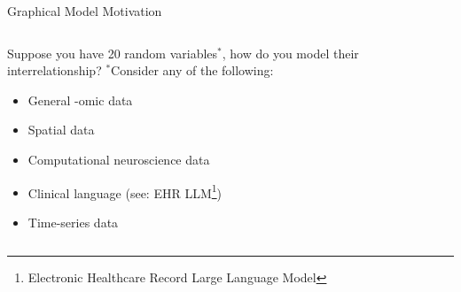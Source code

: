 \documentclass{beamer}
\begin{document}
\begin{frame}{Graphical Model Motivation}
    \begin{columns}[T]
        \begin{column}{0.6\textwidth}
            Suppose you have 20 random variables$^*$, how do you model their interrelationship? \newline 
            \vspace{2mm}
            $^*$Consider any of the following:
            \begin{itemize}
                \setlength
            \item General -omic data
            \item Spatial data 
            \item Computational neuroscience data 
            \item Clinical language (see: EHR LLM\footnote{Electronic Healthcare Record Large Language Model})
            \item Time-series data 
            \end{itemize}
        \end{column}
        \begin{column}{0.4\textwidth}
        \end{column}
    \end{columns}
\end{frame}
\end{document}
